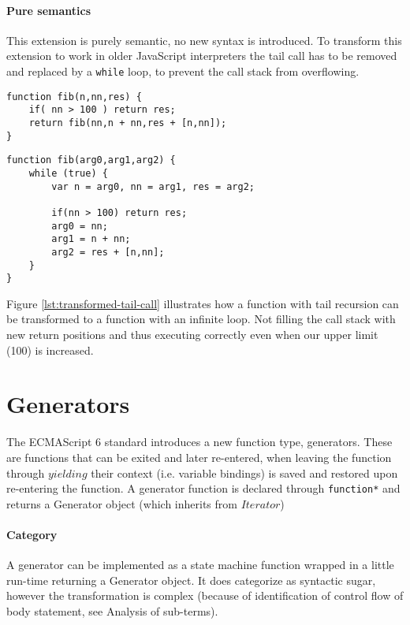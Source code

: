 \paragraph{Pure semantics}
This extension is purely semantic, no new syntax is introduced. To transform this extension to work in older JavaScript interpreters the tail call has to be removed and replaced by a \lstinline$while$ loop, to prevent the call stack from overflowing.

\begin{lstlisting}[caption={Function with tail recursion},label={lst:tail-call}]
function fib(n,nn,res) {
	if( nn > 100 ) return res;
	return fib(nn,n + nn,res + [n,nn]);
}
\end{lstlisting}

\begin{lstlisting}[caption={Semantically identical function, without tail recursion},label={lst:transformed-tail-call}]
function fib(arg0,arg1,arg2) {
	while (true) {
		var n = arg0, nn = arg1, res = arg2;

		if(nn > 100) return res;
		arg0 = nn;
		arg1 = n + nn;
		arg2 = res + [n,nn];
	}
}
\end{lstlisting}

Figure \ref{lst:transformed-tail-call} illustrates how a function with tail recursion can be transformed to a function with an infinite loop. Not filling the call stack with new return positions and thus executing correctly even when our upper limit (100) is increased.

\section{Generators}
The ECMAScript 6 standard introduces a new function type, generators\cite[14.4]{SpecJS}. These are functions that can be exited and later re-entered, when leaving the function through $yielding$ their context (i.e. variable bindings) is saved and restored upon re-entering the function. A generator function is declared through \lstinline$function*$ and returns a Generator object (which inherits from $Iterator$)

\paragraph{Category}
A generator can be implemented as a state machine function wrapped in a little run-time returning a Generator object. It does categorize as syntactic sugar, however the transformation is complex (because of identification of control flow of body statement, see Analysis of sub-terms).

